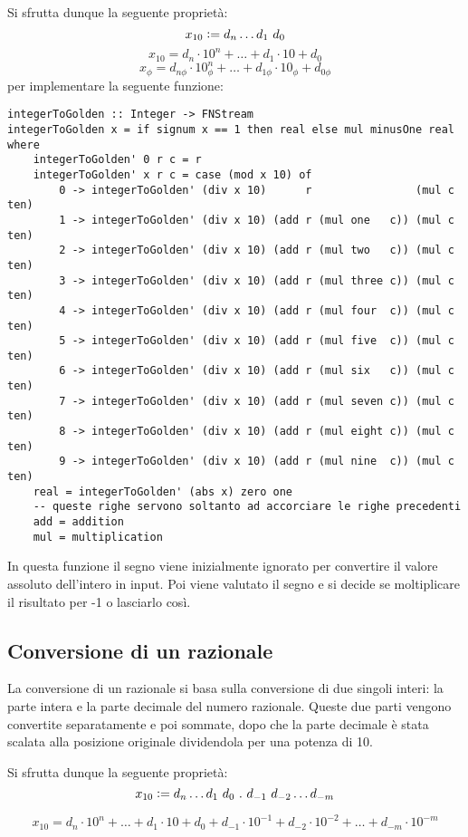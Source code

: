\documentclass[Lau]{sapthesis}
\begin{document}
Si sfrutta dunque la seguente proprietà:
$$x_{10} \vcentcolon = d_n \ldots d_1 \ d_0$$
$$x_{10} = d_n \cdot 10^n + \ldots + d_1 \cdot 10 + d_0$$
$$x_\phi = d_{n\phi} \cdot 10_\phi^n + \ldots + d_{1\phi} \cdot 10_\phi + d_{0\phi}$$
per implementare la seguente funzione:
\begin{verbatim}
integerToGolden :: Integer -> FNStream
integerToGolden x = if signum x == 1 then real else mul minusOne real where
    integerToGolden' 0 r c = r
    integerToGolden' x r c = case (mod x 10) of
        0 -> integerToGolden' (div x 10)      r                (mul c ten)
        1 -> integerToGolden' (div x 10) (add r (mul one   c)) (mul c ten)
        2 -> integerToGolden' (div x 10) (add r (mul two   c)) (mul c ten)
        3 -> integerToGolden' (div x 10) (add r (mul three c)) (mul c ten)
        4 -> integerToGolden' (div x 10) (add r (mul four  c)) (mul c ten)
        5 -> integerToGolden' (div x 10) (add r (mul five  c)) (mul c ten)
        6 -> integerToGolden' (div x 10) (add r (mul six   c)) (mul c ten)
        7 -> integerToGolden' (div x 10) (add r (mul seven c)) (mul c ten)
        8 -> integerToGolden' (div x 10) (add r (mul eight c)) (mul c ten)
        9 -> integerToGolden' (div x 10) (add r (mul nine  c)) (mul c ten)
    real = integerToGolden' (abs x) zero one
    -- queste righe servono soltanto ad accorciare le righe precedenti
    add = addition
    mul = multiplication
\end{verbatim}
In questa funzione il segno viene inizialmente ignorato per convertire il valore assoluto dell'intero in input. Poi viene valutato il segno e si decide se moltiplicare il risultato per -1 o lasciarlo così.


\subsection{Conversione di un razionale}
La conversione di un razionale si basa sulla conversione di due singoli interi: la parte intera e la parte decimale del numero razionale. Queste due parti vengono convertite separatamente e poi sommate, dopo che la parte decimale è stata scalata alla posizione originale dividendola per una potenza di 10.

Si sfrutta dunque la seguente proprietà:
$$x_{10} \vcentcolon = d_n \ldots d_1 \ d_0 \ . \ d_{-1} \ d_{-2} \ldots d_{-m}$$

$$x_{10} = d_n \cdot 10^n + \ldots + d_1 \cdot 10 + d_0 + d_{-1} \cdot 10^{-1} + d_{-2} \cdot 10^{-2} + \ldots + d_{-m} \cdot 10^{-m}$$
\end{document}
